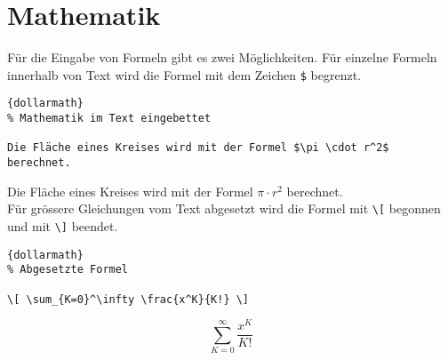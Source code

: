 \section{Mathematik}

\indent
Für die Eingabe von Formeln gibt es zwei Möglichkeiten. Für einzelne Formeln innerhalb von Text wird die Formel mit dem Zeichen \verb?$? begrenzt. 
\begin{center}
\begin{lstlisting}[caption=Mathe im Text]{dollarmath}
% Mathematik im Text eingebettet

Die Fläche eines Kreises wird mit der Formel $\pi \cdot r^2$ berechnet. 
\end{lstlisting}
\end{center}
Die Fläche eines Kreises wird mit der Formel $\pi \cdot r^2$ berechnet. \\

Für grössere Gleichungen vom Text abgesetzt wird die Formel mit \verb?\[? begonnen und mit \verb?\]? beendet. 
\begin{center}
\begin{lstlisting}[caption=Mathe im Text]{dollarmath}
% Abgesetzte Formel

\[ \sum_{K=0}^\infty \frac{x^K}{K!} \]
\end{lstlisting}
\end{center}
\[ \sum_{K=0}^\infty \frac{x^K}{K!} \]
